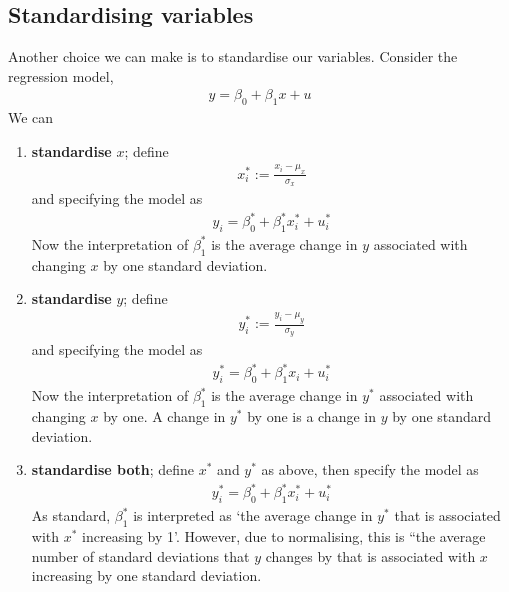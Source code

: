             
        \subsection{Standardising variables}
            Another choice we can make is to standardise our variables. Consider the regression model,
            \begin{align}
                y = \beta_0 + \beta_1 x + u
            \end{align}
            We can
            \begin{enumerate}
                \item \textbf{standardise} $x$; define
                \begin{align}
                    x_i^* := \frac{x_i-\mu_x}{\sigma_x} 
                \end{align}
                and specifying the model as
                \begin{align}
                    y_i  = \beta_0^* + \beta_1^* x^*_i+u_i^*
                \end{align}
                Now the interpretation of $\beta_1^*$ is the average change in $y$ associated with changing $x$ by one standard deviation.

                \item \textbf{standardise} $y$; define
                \begin{align}
                    y_i^* := \frac{y_i-\mu_y}{\sigma_y} 
                \end{align}
                and specifying the model as
                \begin{align}
                    y_i ^* = \beta_0^*+\beta_1^* x_i+u_i^*
                \end{align}
                Now the interpretation of $\beta_1^*$ is the average change in $y^*$ associated with changing $x$ by one. A change in $y^*$ by one is a change in $y$ by one standard deviation.

                \item \textbf{standardise both}; define $x^*$ and $y^*$ as above, then specify the model as
                \begin{align}
                    y_i ^* = \beta_0^*+\beta_1^* x^*_i+u_i^*
                \end{align}
                As standard, $\beta_1^*$ is interpreted as `the average change in $y^*$ that is associated with $x^*$ increasing by 1'. However, due to normalising, this is “the average number of standard deviations that $y$ changes by that is associated with $x$ increasing by one standard deviation.
            \end{enumerate}

